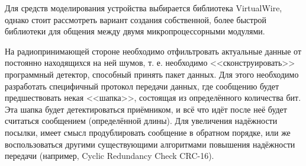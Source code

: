 Для средств моделирования устройства выбирается библиотека VirtualWire, однако стоит рассмотреть вариант создания собственной, более быстрой библиотеки для общения между двумя микропроцессорными модулями.

На радиопринимающей стороне необходимо отфильтровать актуальные данные от постоянно находящихся на ней шумов, т. е. необходимо <<сконструировать>> программный детектор, способный принять пакет данных. Для этого необходимо разработать специфичный протокол передачи данных, где сообщению будет предшествовать некая <<шапка>>, состоящая из определённого количества бит. Эта шапка будет детектироваться приёмником, и всё что идёт после неё будет считаться сообщением (определённой длины). Для увеличения надёжности посылки, имеет смысл продублировать сообщение в обратном порядке, или же воспользоваться другими существующими алгоритмами повышения надёжности передачи (например, Cyclic Redundancy Check CRC-16).
